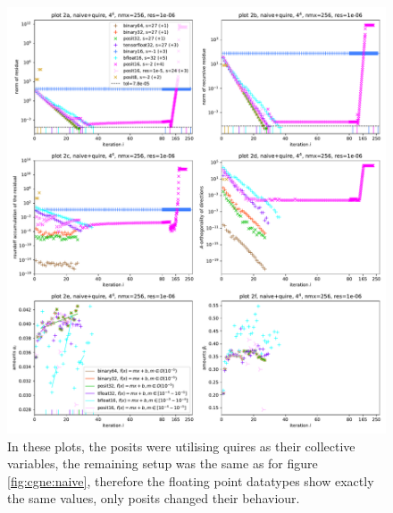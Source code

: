 \documentclass{article}
\theoremstyle{plain} %
\theoremstyle{convention} %
\theoremstyle{remark} %
\numberwithin{equation}{section}
\begin{document}
\begin{figure}
    \centering
    \includegraphics[width=1.0\textwidth]{plots/cgne_final_1}
    \caption{In these plots, the posits were utilising \glspl{quire} as their collective variables, the remaining setup was the same as for figure \ref{fig:cgne:naive}, therefore the floating point datatypes show exactly the same values, only posits changed their behaviour.}
    \label{fig:cgne:quire}
\end{figure}
\end{document}
